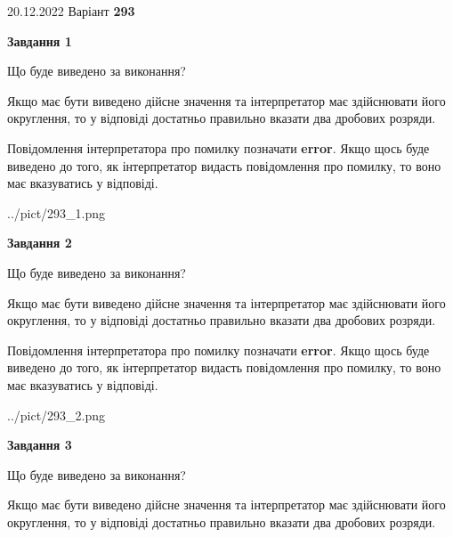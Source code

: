 \documentclass[12pt, ukrainian]{article}
\begin{document}
{20.12.2022 Варіант \No \textbf { 293 }\par}
{
\begin {Large}

{\begin {center}\textbf{Завдання 1}\end {center}}\par
Що буде виведено за виконання? \par

Якщо має бути виведено дійсне значення та інтерпретатор має здійснювати його округлення, 
то у відповіді достатньо правильно вказати два дробових розряди.

Повідомлення інтерпретатора про помилку позначати \textbf{error}.
Якщо щось буде виведено до того, як інтерпретатор видасть повідомлення про помилку, 
то воно має вказуватись у відповіді. \par

\begin{center}
	{../pict/293_1.png}
\end{center}
\newpage

{\begin {center}\textbf{Завдання 2}\end {center}}\par
Що буде виведено за виконання? \par

Якщо має бути виведено дійсне значення та інтерпретатор має здійснювати його округлення, 
то у відповіді достатньо правильно вказати два дробових розряди.

Повідомлення інтерпретатора про помилку позначати \textbf{error}.
Якщо щось буде виведено до того, як інтерпретатор видасть повідомлення про помилку, 
то воно має вказуватись у відповіді. \par

\begin{center}
	{../pict/293_2.png}
\end{center}
\newpage

{\begin {center}\textbf{Завдання 3}\end {center}}\par
Що буде виведено за виконання? \par

Якщо має бути виведено дійсне значення та інтерпретатор має здійснювати його округлення, 
то у відповіді достатньо правильно вказати два дробових розряди.


\end{Large}}
\end{document}
